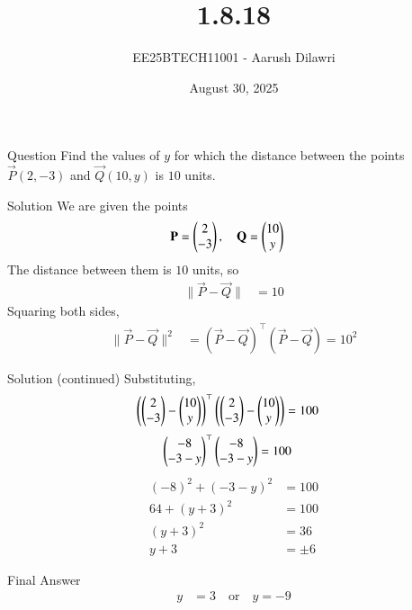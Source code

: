 \documentclass{beamer}
\title{1.8.18}
\date{August 30, 2025}
\author{EE25BTECH11001 - Aarush Dilawri}
\begin{document}
\begin{frame}
  \titlepage
\end{frame}

\begin{frame}{Question}
Find the values of $y$ for which the distance between the points 
$\vec{P}(2,-3)$ and $\vec{Q}(10,y)$ is $10$ units.
\end{frame}

\begin{frame}{Solution}
We are given the points
\begin{align}
\mathbf{P} &= \begin{pmatrix}2\\-3\end{pmatrix}, \quad 
\mathbf{Q} = \begin{pmatrix}10\\y\end{pmatrix}
\end{align}
The distance between them is $10$ units, so
\begin{align}
\|\vec{P}-\vec{Q}\| &= 10
\end{align}
Squaring both sides,
\begin{align}
\|\vec{P}-\vec{Q}\|^2 &= (\vec{P}-\vec{Q})^\top(\vec{P}-\vec{Q}) = 10^2
\end{align}
\end{frame}

\begin{frame}{Solution (continued)}
Substituting,
\begin{align}
\left( \begin{pmatrix}2\\-3\end{pmatrix} - \begin{pmatrix}10\\y\end{pmatrix} \right)^\top
\left( \begin{pmatrix}2\\-3\end{pmatrix} - \begin{pmatrix}10\\y\end{pmatrix} \right) &= 100
\end{align}
\begin{align}
\begin{pmatrix}-8\\-3-y\end{pmatrix}^\top \begin{pmatrix}-8\\-3-y\end{pmatrix} &= 100
\end{align}
\begin{align}
(-8)^2 + (-3-y)^2 &= 100 \\
64 + (y+3)^2 &= 100 \\
(y+3)^2 &= 36 \\
y+3 &= \pm 6
\end{align}
\end{frame}

\begin{frame}{Final Answer}
\begin{align}
y &= 3 \quad \text{or} \quad y = -9
\end{align}
\end{frame}
\end{document}
